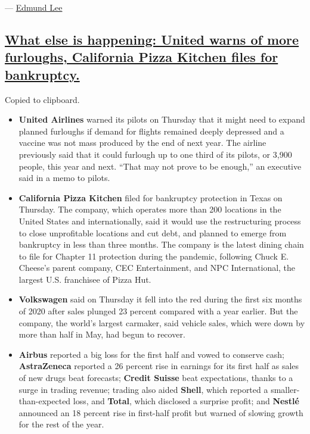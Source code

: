--- \href{https://www.nytimes3xbfgragh.onion/by/edmund-lee}{Edmund Lee}

\hypertarget{what-else-is-happening-united-warns-of-more-furloughs-california-pizza-kitchen-files-for-bankruptcy}{%
\subsection{\texorpdfstring{\protect\hyperlink{what-else-is-happening-united-warns-of-more-furloughs-california-pizza-kitchen-files-for-bankruptcy}{What
else is happening: United warns of more furloughs, California Pizza
Kitchen files for
bankruptcy.}}{What else is happening: United warns of more furloughs, California Pizza Kitchen files for bankruptcy.}}\label{what-else-is-happening-united-warns-of-more-furloughs-california-pizza-kitchen-files-for-bankruptcy}}

Copied to clipboard.

\begin{itemize}
\item
  \textbf{United Airlines} warned its pilots on Thursday that it might
  need to expand planned furloughs if demand for flights remained deeply
  depressed and a vaccine was not mass produced by the end of next year.
  The airline previously said that it could furlough up to one third of
  its pilots, or 3,900 people, this year and next. ``That may not prove
  to be enough,'' an executive said in a memo to pilots.
\item
  \textbf{California Pizza Kitchen} filed for bankruptcy protection in
  Texas on Thursday. The company, which operates more than 200 locations
  in the United States and internationally, said it would use the
  restructuring process to close unprofitable locations and cut debt,
  and planned to emerge from bankruptcy in less than three months. The
  company is the latest dining chain to file for Chapter 11 protection
  during the pandemic, following Chuck E. Cheese's parent company, CEC
  Entertainment, and NPC International, the largest U.S. franchisee of
  Pizza Hut.
\item
  \textbf{Volkswagen} said on Thursday it fell into the red during the
  first six months of 2020 after sales plunged 23 percent compared with
  a year earlier. But the company, the world's largest carmaker, said
  vehicle sales, which were down by more than half in May, had begun to
  recover.
\item
  \textbf{Airbus} reported a big loss for the first half and vowed to
  conserve cash; \textbf{AstraZeneca} reported a 26 percent rise in
  earnings for its first half as sales of new drugs beat forecasts;
  \textbf{Credit Suisse} beat expectations, thanks to a surge in trading
  revenue; trading also aided \textbf{Shell}, which reported a
  smaller-than-expected loss, and \textbf{Total}, which disclosed a
  surprise profit; and \textbf{Nestlé} announced an 18 percent rise in
  first-half profit but warned of slowing growth for the rest of the
  year.
\end{itemize}

